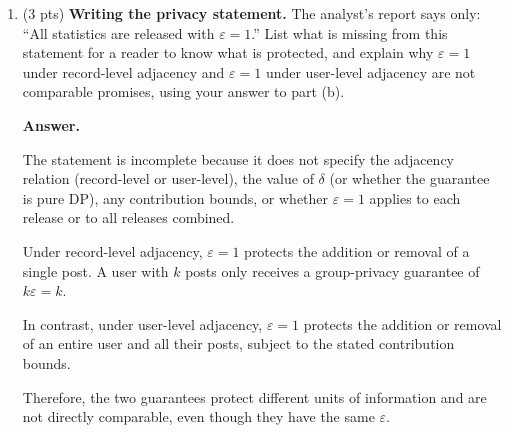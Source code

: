 \documentclass[11pt]{article}
\newcommand{\eps}{\varepsilon}
\newenvironment{answer}{\par\medskip\noindent\textbf{Answer.}\ }{\par\bigskip}
\begin{document}
\begin{enumerate}
\begin{enumerate}
\begin{answer}
\end{answer}
\end{enumerate}

\item (3 pts) \textbf{Writing the privacy statement.} The analyst's report
says only: ``All statistics are released with $\eps=1$.'' List what is
missing from this statement for a reader to know what is protected, and
explain why $\eps=1$ under record-level adjacency and $\eps=1$ under
user-level adjacency are not comparable promises, using your answer to
part (b).

\begin{answer}

The statement is incomplete because it does
not specify the adjacency relation (record-level
or user-level), the value of $\delta$ (or whether
the guarantee is pure DP), any contribution
bounds, or whether $\eps=1$ applies to each
release or to all releases combined.

Under record-level adjacency, $\eps=1$
protects the addition or removal of a single
post. A user with $k$ posts only receives
a group-privacy guarantee of $k\eps=k$.

In contrast, under user-level adjacency,
$\eps=1$ protects the addition or removal
of an entire user and all their posts,
subject to the stated contribution bounds.

Therefore, the two guarantees protect
different units of information and are
not directly comparable, even though
they have the same $\eps$.

\end{answer}

\end{enumerate}
\end{document}
